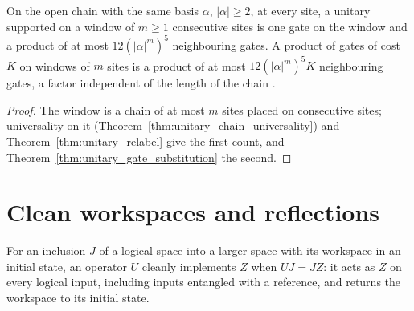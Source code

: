 \begin{theorem}
    \label{thm:unitary_window}
    \leanok
    On the open chain with the same basis $\alpha$, $|\alpha|\ge2$, at every site, a unitary
    supported on a window of $m\ge1$ consecutive sites is one gate on the window and a product
    of at most $12(|\alpha|^m)^5$ neighbouring gates. A product of gates of cost $K$ on
    windows of $m$ sites is a product of at most $12(|\alpha|^m)^5K$ neighbouring gates, a
    factor independent of the length of the chain \cite[caption of Fig.~1]{Malz2024Preparation}.
\end{theorem}
\begin{proof}\leanok
    The window is a chain of at most $m$ sites placed on consecutive sites; universality on it
    (Theorem~\ref{thm:unitary_chain_universality}) and Theorem~\ref{thm:unitary_relabel} give
    the first count, and Theorem~\ref{thm:unitary_gate_substitution} the second.
\end{proof}

\section{Clean workspaces and reflections}
\label{sec:unitary_clean_workspace}

\begin{definition}
    \label{def:unitary_clean_implementation}
    \leanok
    For an inclusion $J$ of a logical space into a larger space with its workspace in an
    initial state, an operator $U$ cleanly implements $Z$ when $UJ=JZ$: it acts as $Z$ on
    every logical input, including inputs entangled with a reference, and returns the
    workspace to its initial state.
\end{definition}

